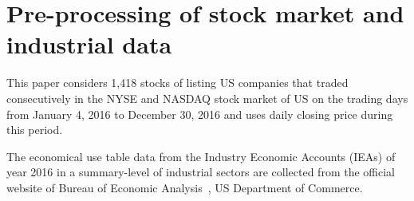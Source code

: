 \chapter[Pre-processing of data]{Pre-processing of stock market and industrial data}
This paper considers 1,418 stocks of listing US companies that traded consecutively in the NYSE and NASDAQ stock market of US on the trading days from January 4, 2016 to December 30, 2016 and uses daily closing price during this period.

The economical use table data from the Industry Economic Accounts (IEAs) of year 2016 in a summary-level of industrial sectors are collected from the official website of Bureau of Economic Analysis~\cite{bea}, US Department of Commerce.